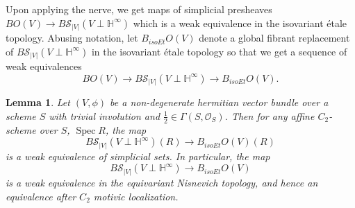 \documentclass[draftthesis,tocnosub,noragright,centerchapter,10pt]{uiucthesis2009}
\newcommand{\mbb}{\mathbb}
\newcommand{\mc}{\mathcal}
\DeclareMathOperator{\Spec}{Spec}
\theoremstyle{plain}
\newtheorem{lemma}{Lemma}
\theoremstyle{definition}
\begin{document}
Upon applying the nerve, we get maps of simplicial presheaves $BO(V)
\rightarrow B\mc S_{|V|}(V\perp \mbb H^\infty)$ which is a weak
equivalence in the isovariant \'etale topology. Abusing notation, let $B_{isoEt}O(V)$
denote a global fibrant replacement of $B\mc S_{|V|}(V\perp \mbb H^\infty)$ in the isovariant
\'etale topology so that we get a sequence of weak equivalences
\[
BO(V) \rightarrow B\mc S_{|V|}(V\perp \mbb H^\infty) \rightarrow B_{isoEt}O(V).
\]

\begin{lemma} \label{weqaff}
Let $(V,\phi)$ be a non-degenerate hermitian vector bundle over a
scheme $S$ with trivial involution and $\frac{1}{2} \in \Gamma(S,\mc
O_S)$. Then for any affine $C_2$-scheme over $S$, $\Spec R$, the map
\[
B\mc S_{|V|}(V\perp \mbb H^\infty)(R) \rightarrow B_{isoEt}O(V)(R)
\]
is a weak equivalence of simplicial sets. In particular, the map
\[
B\mc S_{|V|}(V\perp \mbb H^\infty) \rightarrow B_{isoEt}O(V)
\]
is a weak equivalence in the equivariant Nisnevich topology, and hence an
equivalence after $C_2$ motivic localization. 
\end{lemma}
\end{document}

